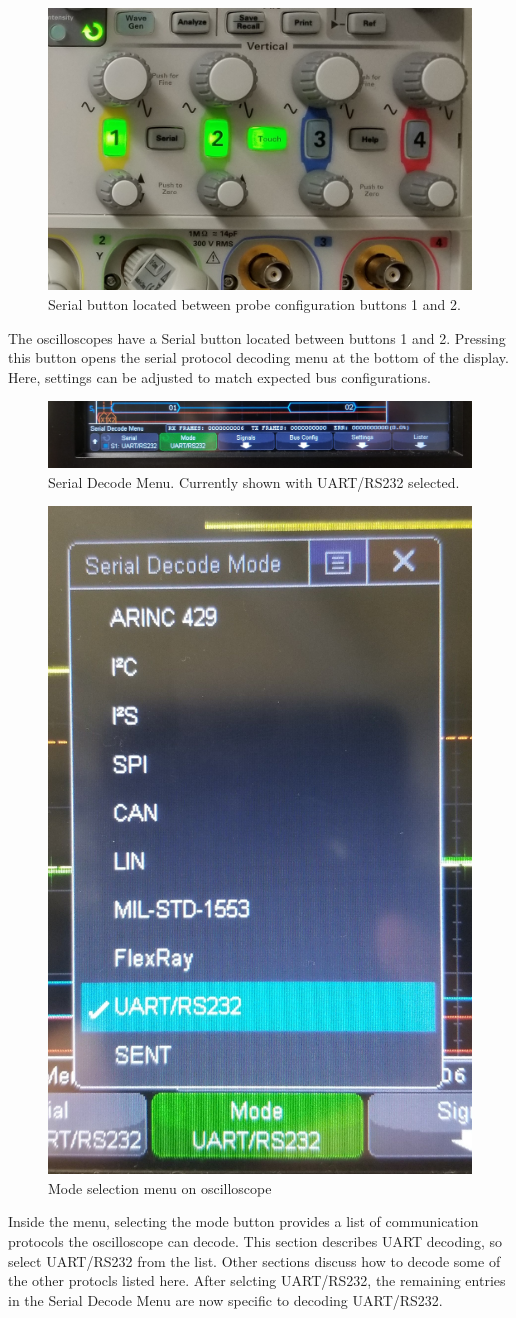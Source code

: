 \documentclass{article}
\begin{document}
  \begin{figure}
    \includegraphics[width=30ex]{serial_button_scope}
    \caption{Serial button located between probe configuration buttons 1 and 2.}
  \end{figure}

  The oscilloscopes have a Serial button located between buttons 1 and 2.
  Pressing this button opens the serial protocol decoding menu at the bottom of
  the display. Here, settings can be adjusted to match expected bus
  configurations.


  \begin{figure}
    \includegraphics[width=44ex]{serial_decode_scope}
    \caption{Serial Decode Menu. Currently shown with UART/RS232 selected.}
  \end{figure}

  \begin{figure}
    \includegraphics[width=25ex]{mode_menu}
    \caption{Mode selection menu on oscilloscope}
  \end{figure}

  Inside the menu, selecting the mode button provides a list of communication
  protocols the oscilloscope can decode. This section describes UART decoding,
  so select UART/RS232 from the list. Other sections discuss how to decode some
  of the other protocls listed here. After selcting UART/RS232, the remaining
  entries in the Serial Decode Menu are now specific to decoding UART/RS232.
\end{document}
